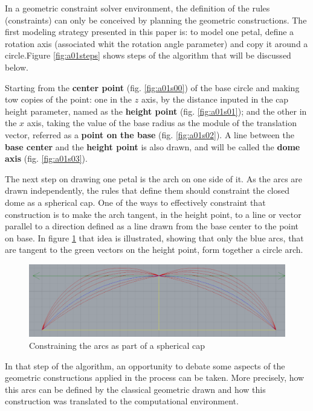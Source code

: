 \documentclass[preprint,12pt,3p]{elsarticle}
\begin{document}
In a geometric constraint solver environment, the definition of the rules (constraints) can only be conceived by planning the geometric constructions. The first modeling strategy presented in this paper is: to model one petal, define a rotation axis (associated whit the rotation angle parameter) and copy it around a circle.Figure \ref{fig:a01steps} shows steps of the algorithm that will be discussed below.

Starting from the \textbf{center point} (fig. \ref{fig:a01s00}) of the base circle and making tow copies of the point: one in the $z$ axis, by the distance inputed in the cap height parameter, named as the \textbf{height point} (fig. \ref{fig:a01s01}); and the other in the $x$ axis, taking the value of the base radius as the module of the translation vector, referred as a \textbf{point on the base} (fig. \ref{fig:a01s02}). A line between the \textbf{base center} and the \textbf{height point} is also drawn, and will be called the \textbf{dome axis} (fig. \ref{fig:a01s03}).

The next step on drawing one petal is the arch on one side of it. As the arcs are drawn independently, the rules that define them should constraint the closed dome as a spherical cap. One of the ways to effectively constraint that construction is to make the arch tangent, in the height point, to a line or vector parallel to a direction defined as a line drawn from the base center to the point on base. In figure \ref{figura:tangente} that idea is illustrated, showing that only the blue arcs, that are tangent to the green vectors on the height point, form together a circle arch.


\begin{figure}[!h]
\begin{center}
\includegraphics[width=0.65
\textwidth]{tangentes.png}
\caption{Constraining the arcs as part of a spherical cap}
\label{figura:tangente}
\end{center}
\end{figure}

In that step of the algorithm, an opportunity to debate some aspects of the geometric constructions applied in the process can be taken. More precisely, how this arcs can be defined by the classical geometric drawn and how this construction was translated to the computational environment. 
\end{document}
